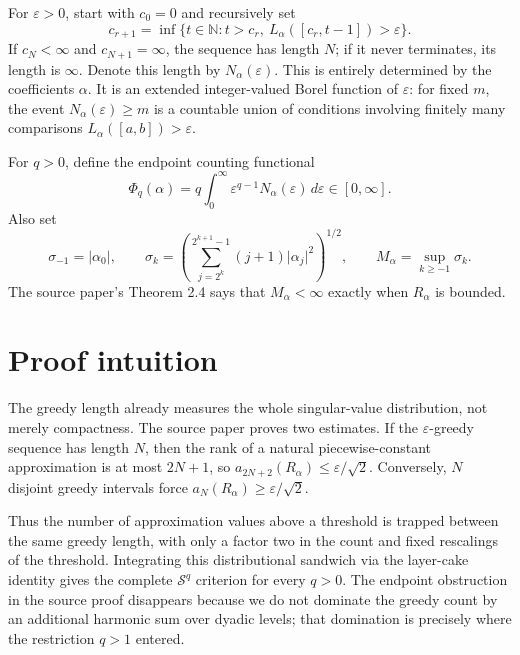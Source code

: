 \documentclass[11pt]{article}
\newcommand{\abs}[1]{\lvert#1\rvert}
\newcommand{\Ncount}{N_\alpha}
\newcommand{\Schatten}{\mathcal S}
\begin{document}
For $\varepsilon>0$, start with $c_0=0$ and recursively set
\begin{equation}\label{eq:greedy}
 c_{r+1}=\inf\{t\in\mathbb N:t>c_r,
          \ L_\alpha([c_r,t-1])>\varepsilon\}.
\end{equation}
If $c_N<\infty$ and $c_{N+1}=\infty$, the sequence has length $N$;
if it never terminates, its length is $\infty$.  Denote this length by
$\Ncount(\varepsilon)$.  This is entirely determined by the coefficients
$\alpha$.  It is an extended integer-valued Borel function of
$\varepsilon$: for fixed $m$, the event $\Ncount(\varepsilon)\geq m$ is a
countable union of conditions involving finitely many comparisons
$L_\alpha([a,b])>\varepsilon$.

For $q>0$, define the endpoint counting functional
\begin{equation}\label{eq:Phi}
 \Phi_q(\alpha)=q\int_0^\infty
   \varepsilon^{q-1}\Ncount(\varepsilon)\,d\varepsilon
 \in[0,\infty].
\end{equation}
Also set
\begin{equation}\label{eq:sigma}
 \sigma_{-1}=\abs{\alpha_0},\qquad
 \sigma_k=\left(\sum_{j=2^k}^{2^{k+1}-1}
                    (j+1)\abs{\alpha_j}^2\right)^{1/2},\qquad
 M_\alpha=\sup_{k\geq-1}\sigma_k.
\end{equation}
The source paper's Theorem 2.4 says that $M_\alpha<\infty$ exactly when
$R_\alpha$ is bounded.

\section{Proof intuition}

The greedy length already measures the whole singular-value distribution,
not merely compactness.  The source paper proves two estimates.  If the
$\varepsilon$-greedy sequence has length $N$, then the rank of a natural
piecewise-constant approximation is at most $2N+1$, so
$a_{2N+2}(R_\alpha)\leq\varepsilon/\sqrt2$.  Conversely, $N$ disjoint greedy
intervals force $a_N(R_\alpha)\geq\varepsilon/\sqrt2$.

Thus the number of approximation values above a threshold is trapped between
the same greedy length, with only a factor two in the count and fixed
rescalings of the threshold.  Integrating this distributional sandwich via
the layer-cake identity gives the complete $\Schatten^q$ criterion for every
$q>0$.  The endpoint obstruction in the source proof disappears because we
do not dominate the greedy count by an additional harmonic sum over dyadic
levels; that domination is precisely where the restriction $q>1$ entered.
\end{document}
